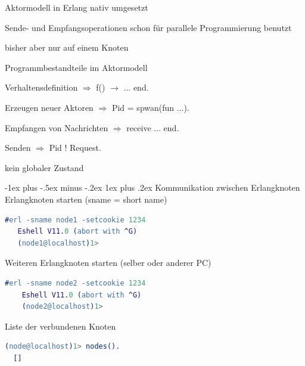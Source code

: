 \documentclass[10pt]{article}
\makeatletter
\renewcommand{\subsubsection}{\@startsection{subsubsection}{3}{0mm}%
                                {-1ex plus -.5ex minus -.2ex}%
                                {1ex plus .2ex}%
                                {\normalfont\small\bfseries}}
\makeatother
\begin{document}
\begin{itemize*}
  \item Aktormodell in Erlang nativ umgesetzt
  \begin{itemize*}
    \item Sende- und Empfangsoperationen schon für parallele Programmierung benutzt
    \item bisher aber nur auf einem Knoten
  \end{itemize*}
  \item Programmbestandteile im Aktormodell
  \begin{itemize*}
    \item Verhaltensdefinition $\Rightarrow$ f() $\rightarrow$ ... end.
    \item Erzeugen neuer Aktoren $\Rightarrow$ Pid = spwan(fun ...).
    \item Empfangen von Nachrichten $\Rightarrow$ receive ... end.
    \item Senden $\Rightarrow$ Pid ! Request.
  \end{itemize*}
  \item kein globaler Zustand
\end{itemize*}

\subsubsection{Kommunikation zwischen Erlangknoten}
Erlangknoten starten (sname = short name)
\begin{lstlisting}[language=erlang]
  #erl -sname node1 -setcookie 1234
   Eshell V11.0 (abort with ^G)
   (node1@localhost)1>
  \end{lstlisting}

Weiteren Erlangknoten starten (selber oder anderer PC)
\begin{lstlisting}[language=erlang]
  #erl -sname node2 -setcookie 1234
    Eshell V11.0 (abort with ^G)
    (node2@localhost)1>
  \end{lstlisting}

Liste der verbundenen Knoten
\begin{lstlisting}[language=erlang]
  (node@localhost)1> nodes().
  []
  \end{lstlisting}
\end{document}
